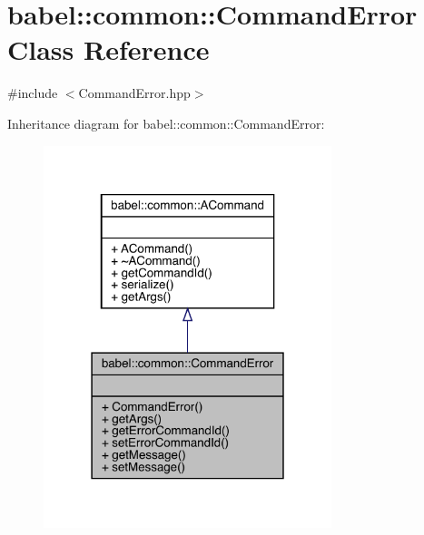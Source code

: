 \hypertarget{classbabel_1_1common_1_1_command_error}{}\section{babel\+:\+:common\+:\+:Command\+Error Class Reference}
\label{classbabel_1_1common_1_1_command_error}


{\ttfamily \#include $<$Command\+Error.\+hpp$>$}



Inheritance diagram for babel\+:\+:common\+:\+:Command\+Error\+:\nopagebreak
\begin{figure}[H]
\begin{center}
\leavevmode
\includegraphics[width=238pt]{classbabel_1_1common_1_1_command_error__inherit__graph}
\end{center}
\end{figure}


